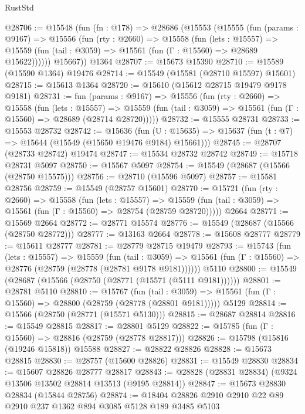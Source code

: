 \begin{lexlean}{RustStd}
\begin{coremodule}
@28706 := @15548
    (fun (fn : @178) =>
    @28686
      (@15553
        (@15555
          (fun (params : @9167) =>
          @15556
            (fun (rty : @2660) =>
            @15558
              (fun (lets : @15557) =>
              @15559 (fun (tail : @3059) => @15561 (fun (Γ : @15560) => @28689 @15622))))))
        @15667))
    @1364
@28707 := @15673 @15390
@28710 := @15589 (@15590 @1364) @19476
@28714 := @15549 (@15581 (@28710 @15597) @15601)
@28715 := @15613 @1364
@28720 := @15610 (@15612 @28715 @19479 @9178 @9181)
@28731 := fun (params : @9167) =>
  @15556
    (fun (rty : @2660) =>
    @15558
      (fun (lets : @15557) =>
      @15559 (fun (tail : @3059) => @15561 (fun (Γ : @15560) => @28689 (@28714 @28720)))))
@28732 := @15555 @28731
@28733 := @15553 @28732
@28742 := @15636
    (fun (U : @15635) => @15637 (fun (t : @7) => @15644 (@15549 (@15650 @19476 @9184) @15661)))
@28745 := @28707 (@28733 @28742) @19474
@28747 := @15534 @28732 @28742
@28749 := @15718 @28731 @5097
@28750 := @15567 @5097
@28754 := @15549 (@28687 (@15566 (@28750 @15575)))
@28756 := @28710 (@15596 @5097)
@28757 := @15581 @28756
@28759 := @15549 (@28757 @15601)
@28770 := @15721
    (fun (rty : @2660) =>
    @15558
      (fun (lets : @15557) =>
      @15559 (fun (tail : @3059) => @15561 (fun (Γ : @15560) => @28754 (@28759 @28720)))))
    @2664
@28771 := @15569 @2664
@28772 := @28771 @15574
@28776 := @15549 (@28687 (@15566 (@28750 @28772)))
@28777 := @13163 @2664
@28778 := @15608 @28777
@28779 := @15611 @28777
@28781 := @28779 @28715 @19479
@28793 := @15743
    (fun (lets : @15557) =>
    @15559
      (fun (tail : @3059) =>
      @15561 (fun (Γ : @15560) => @28776 (@28759 (@28778 (@28781 @9178 @9181))))))
    @5110
@28800 := @15549 (@28687 (@15566 (@28750 (@28771 (@15571 (@5111 @9181))))))
@28801 := @28781 @5110
@28810 := @15767
    (fun (tail : @3059) => @15561 (fun (Γ : @15560) => @28800 (@28759 (@28778 (@28801 @9181)))))
    @5129
@28814 := @15566 (@28750 (@28771 (@15571 @5130)))
@28815 := @28687 @28814
@28816 := @15549 @28815
@28817 := @28801 @5129
@28822 := @15785 (fun (Γ : @15560) => @28816 (@28759 (@28778 @28817)))
@28826 := @15798 (@15816 (@19246 @15818)) @15588
@28827 := @28822 @28826
@28828 := @15673 @28815
@28830 := @28757 (@15600 @28826)
@28831 := @15549 @28830
@28834 := @15607 @28826 @28777 @28817
@28843 := @28828 (@28831 @28834) (@9324 @13506 @13502 @28814 @13513 (@9195 @28814))
@28847 := @15673 @28830 @28834 (@15844 @28756)
@28874 := @18404
    @28826
    @2910
    @2910
    @22
    @89
    @2910
    @237
    @1362
    @894
    @3085
    @5128
    @189
    @3485
    @5103

\end{coremodule}
\end{lexlean}
